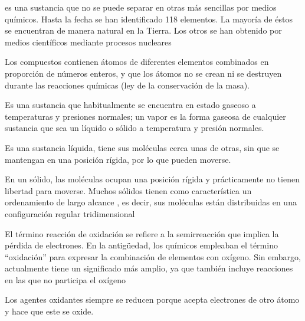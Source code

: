 \begin{definition}
	es una sustancia que no se puede separar en otras más sencillas por
	medios químicos. Hasta la fecha se han identificado 118 elementos. La mayoría de éstos se encuentran de manera natural en la Tierra.
	Los otros se han obtenido por medios científicos mediante procesos nucleares
\end{definition}

\begin{definition}
	Los compuestos contienen átomos de diferentes
	elementos combinados en proporción de números enteros,
	y que los átomos no se crean ni se destruyen durante las
	reacciones químicas (ley de la conservación de la masa).
\end{definition}

\begin{definition}[Gas]
	Es una sustancia que habitualmente se encuentra en estado gaseoso
	a temperaturas y presiones normales; un vapor es la forma gaseosa
	de cualquier sustancia que sea un líquido o sólido a temperatura y presión normales.
\end{definition}

\begin{definition}[Líquido]
	Es una sustancia líquida, tiene sus moléculas cerca unas de otras,
	sin que se mantengan en una posición rígida, por lo que
	pueden moverse.
\end{definition}

\begin{definition}[Sólido]
	En un sólido, las moléculas ocupan una posición rígida y prácticamente no tienen
	libertad para moverse. Muchos sólidos tienen como característica un ordenamiento de
	largo alcance , es decir, sus moléculas están distribuidas en una configuración regular tridimensional
\end{definition}


\begin{definition}[Oxidación]
	El término reacción de oxidación se refiere a la semirreacción que implica la pérdida de electrones. En la antigüedad, los químicos empleaban el término “oxidación” para
	expresar la combinación de elementos con oxígeno. Sin embargo, actualmente tiene un
	significado más amplio, ya que también incluye reacciones en las que no participa el
	oxígeno
\end{definition}

\begin{definition}
	Los agentes oxidantes siempre se reducen porque acepta electrones de otro átomo y
	hace que este se oxide.
\end{definition}

